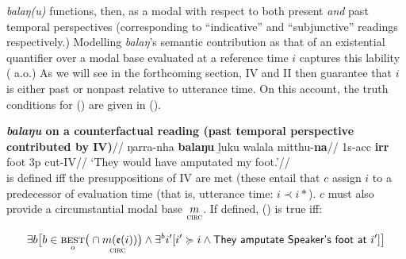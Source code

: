 \textit{balaŋ(u)} functions, then, as a modal with respect to both present \textit{and} past temporal perspectives (corresponding to ``indicative'' and ``subjunctive'' readings respectively.) Modelling \textit{balaŋ}'s semantic contribution as that of an existential quantifier over a modal base evaluated at a reference time $ i $ captures this lability  (\citealp{Condoravdi2002,Condoravdi2003} a.o.) As we will see in the forthcoming section, \gls{IV} and \gls{II} then guarantee that $ i $ is either past or nonpast relative to utterance time. On this account, the truth conditions for () are given in (\nextx).


\ex  
\begingl\glpreamble\textbf{\textit{balaŋu} on a counterfactual reading (past temporal perspective contributed by \gls{IV})}//
\gla ŋarra-nha \textbf{balaŋu} ḻuku walala mitthu-\textbf{na}//
\glb 1s-\gls{acc} \textbf{\gls{irr}} foot 3p cut-\gls{IV}//
\glft`They would have amputated my foot.'\trailingcitation{[DhG~20190417]}//\endgl\\

 is defined iff the presuppositions of \gls{IV} are met (these entail that $ c $ assign $ i $ to a predecessor of evaluation time (that is, utterance time: $ i\prec i* $). $ c $ must also provide a circumstantial modal base $ \underset{\textsc{circ}}{m} $. If defined, () is true iff:

$$\exists b\big[b\in\underset{o}{\textsc{best}}\big(\cap{\underset{\textsc{circ}}{m(\mathfrak e(i)})}\big)\wedge \exists{}^b i'[i'\succcurlyeq i\wedge\textsf{They amputate Speaker's foot at }i']\big] $$

